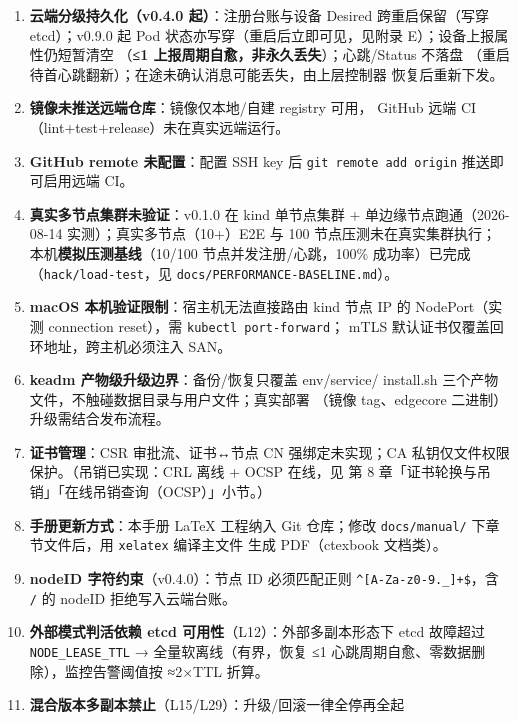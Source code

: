 \begin{enumerate}
  \item \textbf{云端分级持久化（v0.4.0 起）}：注册台账与设备 Desired
        跨重启保留（写穿 etcd）；v0.9.0 起 Pod 状态亦写穿（重启后立即可见，见附录 E）；设备上报属性仍短暂清空
        （\textbf{≤1 上报周期自愈，非永久丢失}）；心跳/Status 不落盘
        （重启待首心跳翻新）；在途未确认消息可能丢失，由上层控制器
        恢复后重新下发。
  \item \textbf{镜像未推送远端仓库}：镜像仅本地/自建 registry 可用，
        GitHub 远端 CI（lint+test+release）未在真实远端运行。
  \item \textbf{GitHub remote 未配置}：配置 SSH key 后
        \texttt{git remote add origin} 推送即可启用远端 CI。
  \item \textbf{真实多节点集群未验证}：v0.1.0 在 kind 单节点集群 +
        单边缘节点跑通（2026-08-14 实测）；真实多节点（10+）E2E 与
        100 节点压测未在真实集群执行；本机\textbf{模拟压测基线}（10/100
        节点并发注册/心跳，100\% 成功率）已完成
        （\texttt{hack/load-test}，见 \texttt{docs/PERFORMANCE-BASELINE.md}）。
  \item \textbf{macOS 本机验证限制}：宿主机无法直接路由 kind 节点 IP 的
        NodePort（实测 connection reset），需 \texttt{kubectl port-forward}；
        mTLS 默认证书仅覆盖回环地址，跨主机必须注入 SAN。
  \item \textbf{keadm 产物级升级边界}：备份/恢复只覆盖 env/service/
        install.sh 三个产物文件，不触碰数据目录与用户文件；真实部署
        （镜像 tag、edgecore 二进制）升级需结合发布流程。
  \item \textbf{证书管理}：CSR 审批流、证书↔节点 CN 强绑定未实现；CA
        私钥仅文件权限保护。（吊销已实现：CRL 离线 + OCSP 在线，见
        第 8 章「证书轮换与吊销」「在线吊销查询（OCSP）」小节。）
  \item \textbf{手册更新方式}：本手册 LaTeX 工程纳入 Git 仓库；修改
        \texttt{docs/manual/} 下章节文件后，用 \texttt{xelatex} 编译主文件
        生成 PDF（ctexbook 文档类）。
  \item \textbf{nodeID 字符约束}（v0.4.0）：节点 ID 必须匹配正则
        \texttt{\textasciicircum{}[A-Za-z0-9.\_\-]+\$}，含 \texttt{/} 的
        nodeID 拒绝写入云端台账。
  \item \textbf{外部模式判活依赖 etcd 可用性}（L12）：外部多副本形态下
        etcd 故障超过 \texttt{NODE\_LEASE\_TTL} → 全量软离线（有界，恢复
        ≤1 心跳周期自愈、零数据删除），监控告警阈值按 ≈2×TTL 折算。
  \item \textbf{混合版本多副本禁止}（L15/L29）：升级/回滚一律全停再全起

\end{enumerate}
